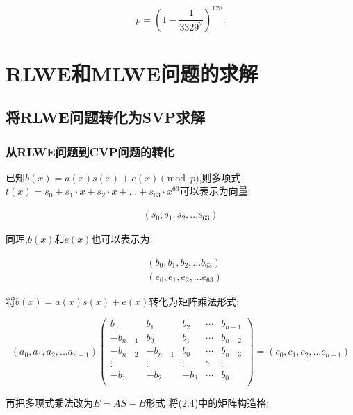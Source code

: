 \documentclass[12pt,a4paper]{article}
\numberwithin{equation}{section}
\begin{document}
\begin{equation}
	p = \left(1 - \frac{1}{3329^2}\right)^{128}.
\end{equation}



\section{RLWE和MLWE问题的求解}

\subsection{将RLWE问题转化为SVP求解}

\subsubsection{从RLWE问题到CVP问题的转化}

已知$b(x)=a(x)s(x)+e(x) \pmod p$,则多项式$t(x)=s_0+s_1 \cdot x + s_2 \cdot x + \ldots + s_{63} \cdot x^{63}$可以表示为向量:

\begin{align}
	(s_0,s_1,s_2,...s_{63})
\end{align}

同理,$b(x)$和$e(x)$也可以表示为:

\begin{align}
	 & (b_0,b_1,b_2,...b_{63}) \\
	 & (e_0,e_1,e_2,...e_{63})
\end{align}

将$b(x)=a(x)s(x)+e(x)$转化为矩阵乘法形式:

\begin{equation}
	(a_0,a_1,a_2,...a_{n-1})
	\left(
	\begin{smallmatrix}
			b_0      & b_1      & b_2    & \cdots & b_{n-1} \\
			-b_{n-1} & b_0      & b_1    & \cdots & b_{n-2} \\
			-b_{n-2} & -b_{n-1} & b_0    & \cdots & b_{n-3} \\
			\vdots   & \vdots   & \vdots & \ddots & \vdots  \\
			-b_1     & -b_2     & -b_3   & \cdots & b_0     \\
		\end{smallmatrix}
	\right)
	=
	(c_0,c_1,c_2,...c_{n-1})
\end{equation}

再把多项式乘法改为$E=AS-B$形式
将(2.4)中的矩阵构造格:
\end{document}
